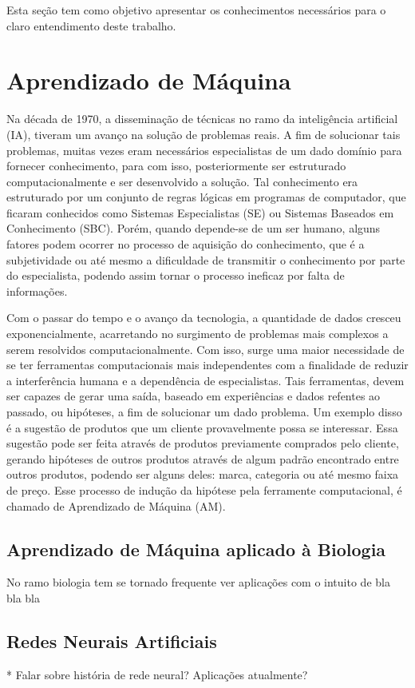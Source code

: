 Esta seção tem como objetivo apresentar os conhecimentos necessários para o claro entendimento deste trabalho.

\section{Aprendizado de Máquina}
Na década de 1970, a disseminação de técnicas no ramo da inteligência artificial (IA), tiveram um avanço na solução de problemas reais. A fim de solucionar tais problemas, muitas vezes eram necessários especialistas de um dado domínio para fornecer conhecimento, para com isso, posteriormente ser estruturado computacionalmente e ser desenvolvido a solução. Tal conhecimento era estruturado por um conjunto de regras lógicas em programas de computador, que ficaram conhecidos como Sistemas Especialistas (SE) ou Sistemas Baseados em Conhecimento (SBC). Porém, quando depende-se de um ser humano, alguns fatores podem ocorrer no processo de aquisição do conhecimento, que é a subjetividade ou até mesmo a dificuldade de transmitir o conhecimento por parte do especialista, podendo assim tornar o processo ineficaz por falta de informações.

Com o passar do tempo e o avanço da tecnologia, a quantidade de dados cresceu exponencialmente, acarretando no surgimento de problemas mais complexos a serem resolvidos computacionalmente. Com isso, surge uma maior necessidade de se ter ferramentas computacionais mais independentes com a finalidade de reduzir a interferência humana e a dependência de especialistas. Tais ferramentas, devem ser capazes de gerar uma saída, baseado em experiências e dados refentes ao passado, ou hipóteses, a fim de solucionar um dado problema. Um exemplo disso é a sugestão de produtos que um cliente provavelmente possa se interessar. Essa sugestão pode ser feita através de produtos previamente comprados pelo cliente, gerando hipóteses de outros produtos através de algum padrão encontrado entre outros produtos, podendo ser alguns deles: marca, categoria ou até mesmo faixa de preço. Esse processo de indução da hipótese pela ferramente computacional, é chamado de Aprendizado de Máquina (AM).

\subsection{Aprendizado de Máquina aplicado à Biologia}
No ramo biologia tem se tornado frequente ver aplicações com o intuito de bla bla bla

\subsection{Redes Neurais Artificiais}
* Falar sobre história de rede neural? Aplicações atualmente?

